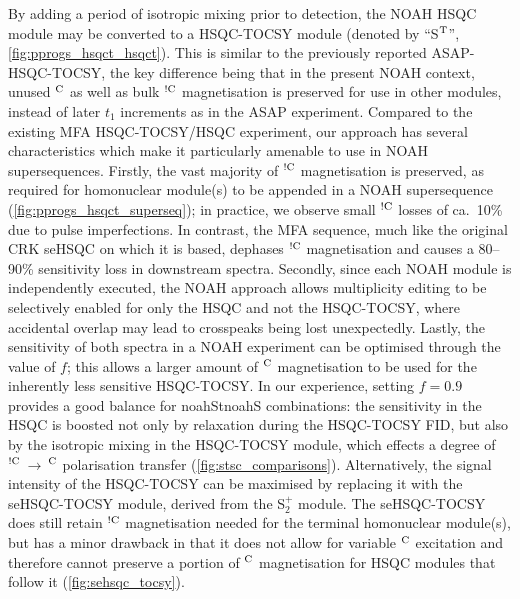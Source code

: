 \documentclass[11pt]{article}
\newcommand*{\noahtwo}[2]{\csname noah#1\endcsname\csname noah#2\endcsname}
\newcommand*{\noahSpb}{S$^+_2$}
\newcommand*{\noahSt}{S$\rm ^T$}
\newcommand*{\magn}[1]{\ce{^1H}$^{#1}$}
\newcommand*{\magnnot}[1]{\ce{^1H}$^{!#1}$}
\begin{document}
\begin{refsection}
By adding a period of isotropic mixing prior to detection, the NOAH HSQC module may be converted to a HSQC-TOCSY module (denoted by ``\noahSt{}'', \cref{fig:pprogs_hsqct_hsqct}).
This is similar to the previously reported ASAP-HSQC-TOCSY,\autocite{Becker2019JMR} the key difference being that in the present NOAH context, unused \magn{\ce{C}} as well as bulk \magnnot{\ce{C}} magnetisation is preserved for use in other modules, instead of later $t_1$ increments as in the ASAP experiment.
Compared to the existing MFA HSQC-TOCSY/HSQC experiment,\autocite{Nolis2019CPC} our approach has several characteristics which make it particularly amenable to use in NOAH supersequences.
Firstly, the vast majority of \magnnot{\ce{C}} magnetisation is preserved, as required for homonuclear module(s) to be appended in a NOAH supersequence (\cref{fig:pprogs_hsqct_superseq}); in practice, we observe small \magnnot{\ce{C}} losses of ca.\ 10\% due to pulse imperfections.
In contrast, the MFA sequence, much like the original CRK seHSQC on which it is based, dephases \magnnot{\ce{C}} magnetisation and causes a 80--90\% sensitivity loss in downstream spectra.
Secondly, since each NOAH module is independently executed, the NOAH approach allows multiplicity editing to be selectively enabled for only the HSQC and not the HSQC-TOCSY, where accidental overlap may lead to crosspeaks being lost unexpectedly.
Lastly, the sensitivity of both spectra in a NOAH experiment can be optimised through the value of $f$; this allows a larger amount of \magn{\ce{C}} magnetisation to be used for the inherently less sensitive HSQC-TOCSY.
In our experience, setting $f = 0.9$ provides a good balance for \noahtwo{St}{S} combinations: the sensitivity in the HSQC is boosted not only by relaxation during the HSQC-TOCSY FID, but also by the isotropic mixing in the HSQC-TOCSY module, which effects a degree of \magnnot{\ce{C}}\,$\to\,$\magn{\ce{C}} polarisation transfer (\cref{fig:stsc_comparisons}).
Alternatively, the signal intensity of the HSQC-TOCSY can be maximised by replacing it with the seHSQC-TOCSY module, derived from the \noahSpb{} module.\autocite{Hansen2021}
The seHSQC-TOCSY does still retain \magnnot{\ce{C}} magnetisation needed for the terminal homonuclear module(s), but has a minor drawback in that it does not allow for variable \magn{\ce{C}} excitation and therefore cannot preserve a portion of \magn{\ce{C}} magnetisation  for HSQC modules that follow it (\cref{fig:sehsqc_tocsy}).



\end{refsection}
\end{document}
